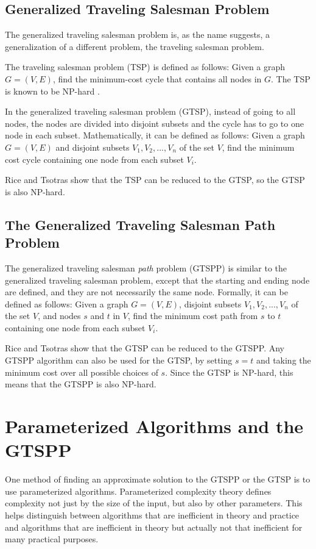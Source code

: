 \documentclass{sig-alternate}
\begin{document}
\subsection{Generalized Traveling Salesman Problem}
\label{subs:GTSP}
The generalized traveling salesman problem is, as the name suggests, a generalization of a different problem, the traveling salesman problem. 

The traveling salesman problem (TSP) is defined as follows: Given a graph $G=(V,E)$, find the minimum-cost cycle that contains all nodes in $G$. The TSP is known to be NP-hard \cite{Papadimitriou:1982}. 

In the generalized traveling salesman problem (GTSP), instead of going to all nodes, the nodes are divided into disjoint subsets and the cycle has to go to one node in each subset. Mathematically, it can be defined as follows: 
Given a graph $G=(V,E)$ and disjoint subsets $V_{1}, V_{2},...,V_{n}$ of the set $V$, find the minimum cost cycle containing one node from each subset $V_{i}$. 

Rice and Tsotras \cite{Rice:2013} show that the TSP can be reduced to the GTSP, so the GTSP is also NP-hard. 
\subsection{The Generalized Traveling Salesman Path Problem}
\label{subs:GTSPP}
The generalized traveling salesman \textit{path} problem (GTSPP) is similar to the generalized traveling salesman problem, except that the starting and ending node are defined, and they are not necessarily the same node. Formally, it can be defined as follows: Given a graph $G=(V,E)$, disjoint subsets $V_{1}, V_{2},...,V_{n}$ of the set $V$, and nodes $s$ and $t$ in $V$, find the minimum cost path from $s$ to $t$ containing one node from each subset $V_{i}$. 

Rice and Tsotras \cite{Rice:2013} show that the GTSP can be reduced to the GTSPP. Any GTSPP algorithm can also be used for the GTSP, by setting $s=t$ and taking the minimum cost over all possible choices of $s$. Since the GTSP is NP-hard, this means that the GTSPP is also NP-hard. 

\section{Parameterized Algorithms and the GTSPP}
\label{sec:parameterized}

One method of finding an approximate solution to the GTSPP or the GTSP is to use parameterized algorithms. Parameterized complexity theory defines complexity not just by the size of the input, but also by other parameters. This helps distinguish between algorithms that are inefficient in theory and practice and algorithms that are inefficient in theory but actually not that inefficient for many practical purposes. 
\end{document}
